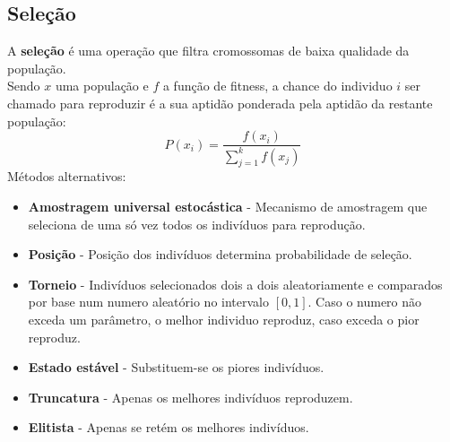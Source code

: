 \documentclass[]{report}
\begin{document}
\subsection{Seleção}
A \textbf{seleção} é uma operação que filtra cromossomas de baixa qualidade da população.\\
Sendo $x$ uma população e $f$ a função de fitness, a chance do individuo $i$ ser chamado para reproduzir é a sua aptidão ponderada pela aptidão da restante população:
$$P(x_i) = \frac{f(x_i)}{\sum \limits_{j=1}^{k}f(x_j)}$$
Métodos alternativos:
\begin{itemize}
	\item \textbf{Amostragem universal estocástica} - Mecanismo de amostragem que seleciona de uma só vez todos os indivíduos para reprodução.
	\item \textbf{Posição} - Posição dos indivíduos determina probabilidade de seleção.
	\item \textbf{Torneio} - Indivíduos selecionados dois a dois aleatoriamente e comparados por base num numero aleatório no intervalo $[0,1]$. Caso o numero não exceda um parâmetro, o melhor individuo reproduz, caso exceda o pior reproduz.
	\item \textbf{Estado estável} - Substituem-se os piores indivíduos.
	\item \textbf{Truncatura} - Apenas os melhores indivíduos reproduzem.
	\item \textbf{Elitista} - Apenas se retém os melhores indivíduos.
\end{itemize}
\end{document}
